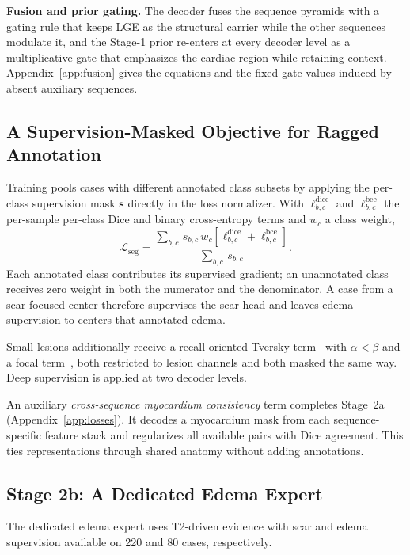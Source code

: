 \documentclass[runningheads]{llncs}
\begin{document}
\noindent\textbf{Fusion and prior gating.} The decoder fuses the sequence
pyramids with a gating rule that keeps LGE as the structural carrier while the
other sequences modulate it, and the Stage-1 prior re-enters at every decoder
level as a multiplicative gate that emphasizes the cardiac region while retaining
context. Appendix~\ref{app:fusion} gives the equations and the fixed gate
values induced by absent auxiliary sequences.

\subsection{A Supervision-Masked Objective for Ragged Annotation}

Training pools cases with different annotated class subsets by applying the
per-class supervision mask $\mathbf{s}$ directly in the loss normalizer. With $\ell^{\text{dice}}_{b,c}$ and
$\ell^{\text{bce}}_{b,c}$ the per-sample per-class Dice and binary
cross-entropy terms and $w_c$ a class weight,
\begin{equation}
\mathcal{L}_{\text{seg}}
=\frac{\sum_{b,c}\,s_{b,c}\,w_c\left[\ell^{\text{dice}}_{b,c}+\ell^{\text{bce}}_{b,c}\right]}
       {\sum_{b,c}\,s_{b,c}} .
\label{eq:masked}
\end{equation}
Each annotated class contributes its supervised gradient; an unannotated class
receives zero weight in both the numerator and the denominator. A case from a
scar-focused center therefore supervises the scar head and leaves edema
supervision to centers that annotated edema.

Small lesions additionally receive a recall-oriented Tversky
term~\cite{salehi2017tversky} with $\alpha<\beta$ and a focal
term~\cite{lin2017focal}, both restricted to lesion channels and both masked the
same way. Deep supervision is applied at two decoder levels.

An auxiliary \emph{cross-sequence myocardium consistency} term completes
Stage~2a (Appendix~\ref{app:losses}). It decodes a myocardium mask from each
sequence-specific feature stack and regularizes all available pairs with Dice
agreement. This ties representations through shared anatomy without adding
annotations.

\subsection{Stage 2b: A Dedicated Edema Expert}

The dedicated edema expert uses T2-driven evidence with scar and edema
supervision available on 220 and 80 cases, respectively.
\end{document}
